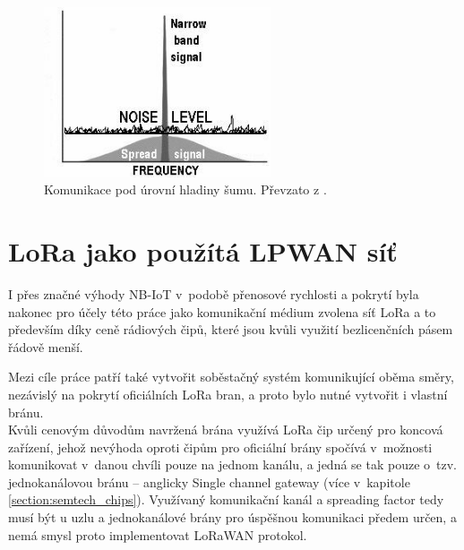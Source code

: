     \begin{figure} [!ht]
        \centering
        \caption{Komunikace pod úrovní hladiny šumu. Převzato z \cite{picture_website:2}.}
        \includegraphics[width=0.6\textwidth]{LPWAN/Figs/lora_noise.jpg}
    \end{figure} 
    

\section{LoRa jako použítá LPWAN síť}
\label{section:single_channel_gw}
    I přes značné výhody NB-IoT v~podobě přenosové rychlosti a pokrytí byla nakonec pro účely této práce  jako komunikační médium zvolena síť LoRa a to především díky ceně rádiových čipů, které jsou kvůli využití bezlicenčních pásem řádově menší.
    
    Mezi cíle práce patří také vytvořit soběstačný systém komunikující oběma směry, nezávislý na pokrytí oficiálních LoRa bran, a proto bylo nutné vytvořit i vlastní bránu.\\
    Kvůli cenovým důvodům navržená brána využívá LoRa čip určený pro koncová zařízení, jehož nevýhoda oproti čipům pro oficiální brány spočívá v~možnosti komunikovat v~danou chvíli pouze na jednom kanálu, a jedná se tak pouze o~tzv. jednokanálovou bránu – anglicky Single channel gateway (více v~kapitole \ref{section:semtech_chips}). Využívaný komunikační kanál a spreading factor tedy musí být u uzlu a jednokanálové brány pro úspěšnou komunikaci předem určen, a nemá smysl proto implementovat LoRaWAN protokol.
    
